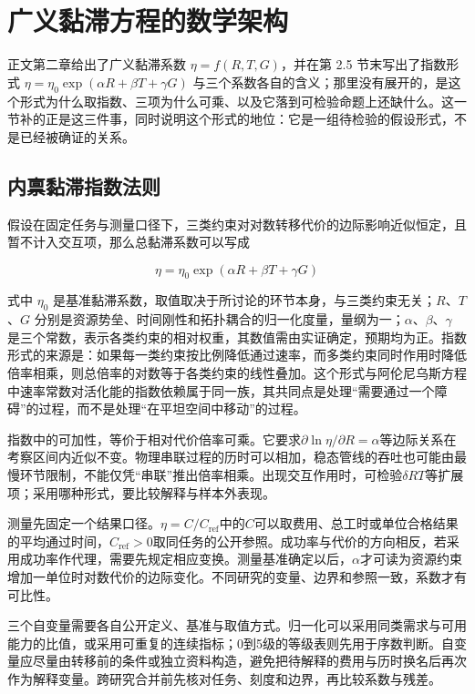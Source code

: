 \section{广义黏滞方程的数学架构}

正文第二章给出了广义黏滞系数 $\eta = f(R,T,G)$，并在第 2.5 节末写出了指数形式 $\eta=\eta_0\exp(\alpha R+\beta T+\gamma G)$ 与三个系数各自的含义；那里没有展开的，是这个形式为什么取指数、三项为什么可乘、以及它落到可检验命题上还缺什么。这一节补的正是这三件事，同时说明这个形式的地位：它是一组待检验的假设形式，不是已经被确证的关系。

\subsection{内禀黏滞指数法则}

假设在固定任务与测量口径下，三类约束对对数转移代价的边际影响近似恒定，且暂不计入交互项，那么总黏滞系数可以写成

\begin{equation}
\eta = \eta_0 \exp\left(\alpha R + \beta T + \gamma G\right)
\end{equation}

式中 $\eta_0$ 是基准黏滞系数，取值取决于所讨论的环节本身，与三类约束无关；$R$、$T$、$G$ 分别是资源势垒、时间刚性和拓扑耦合的归一化度量，量纲为一；$\alpha$、$\beta$、$\gamma$ 是三个常数，表示各类约束的相对权重，其数值需由实证确定，预期均为正。指数形式的来源是：如果每一类约束按比例降低通过速率，而多类约束同时作用时降低倍率相乘，则总倍率的对数等于各类约束的线性叠加。这个形式与阿伦尼乌斯方程中速率常数对活化能的指数依赖属于同一族，其共同点是处理“需要通过一个障碍”的过程，而不是处理“在平坦空间中移动”的过程。

指数中的可加性，等价于相对代价倍率可乘。它要求$\partial\ln\eta/\partial R=\alpha$等边际关系在考察区间内近似不变。物理串联过程的历时可以相加，稳态管线的吞吐也可能由最慢环节限制，不能仅凭“串联”推出倍率相乘。出现交互作用时，可检验$\delta RT$等扩展项；采用哪种形式，要比较解释与样本外表现。

测量先固定一个结果口径。$\eta=C/C_{\mathrm{ref}}$中的$C$可以取费用、总工时或单位合格结果的平均通过时间，$C_{\mathrm{ref}}>0$取同任务的公开参照。成功率与代价的方向相反，若采用成功率作代理，需要先规定相应变换。测量基准确定以后，$\alpha$才可读为资源约束增加一单位时对数代价的边际变化。不同研究的变量、边界和参照一致，系数才有可比性。

三个自变量需要各自公开定义、基准与取值方式。归一化可以采用同类需求与可用能力的比值，或采用可重复的连续指标；0到5级的等级表则先用于序数判断。自变量应尽量由转移前的条件或独立资料构造，避免把待解释的费用与历时换名后再次作为解释变量。跨研究合并前先核对任务、刻度和边界，再比较系数与残差。

